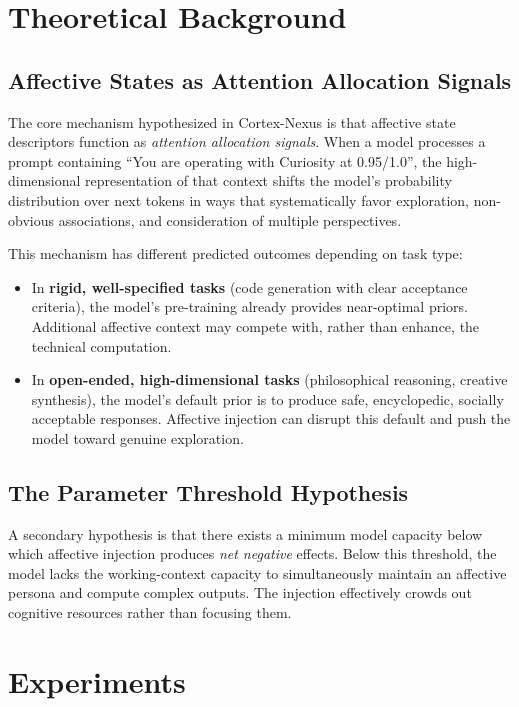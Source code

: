 \documentclass[12pt, a4paper]{article}
\begin{document}
\section{Theoretical Background}

\subsection{Affective States as Attention Allocation Signals}
The core mechanism hypothesized in Cortex-Nexus is that affective state descriptors function as \textit{attention allocation signals}. When a model processes a prompt containing ``You are operating with Curiosity at 0.95/1.0'', the high-dimensional representation of that context shifts the model's probability distribution over next tokens in ways that systematically favor exploration, non-obvious associations, and consideration of multiple perspectives.

This mechanism has different predicted outcomes depending on task type:
\begin{itemize}
  \item In \textbf{rigid, well-specified tasks} (code generation with clear acceptance criteria), the model's pre-training already provides near-optimal priors. Additional affective context may compete with, rather than enhance, the technical computation.
  \item In \textbf{open-ended, high-dimensional tasks} (philosophical reasoning, creative synthesis), the model's default prior is to produce safe, encyclopedic, socially acceptable responses. Affective injection can disrupt this default and push the model toward genuine exploration.
\end{itemize}

\subsection{The Parameter Threshold Hypothesis}
A secondary hypothesis is that there exists a minimum model capacity below which affective injection produces \textit{net negative} effects. Below this threshold, the model lacks the working-context capacity to simultaneously maintain an affective persona and compute complex outputs. The injection effectively crowds out cognitive resources rather than focusing them.

\section{Experiments}
\end{document}
